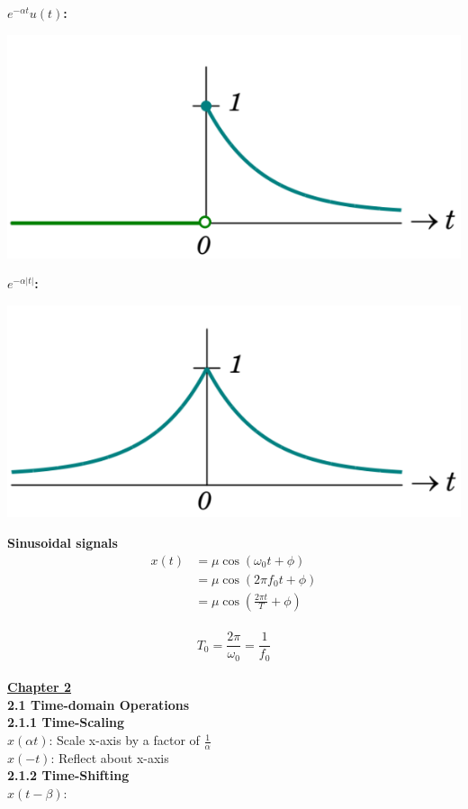 \documentclass[6pt,landscape,a4paper]{extarticle}
\newenvironment{Figure}
  {\par\medskip\noindent\minipage{\linewidth}}
  {\endminipage\par\medskip}
\begin{document}
\begin{multicols*}{5}
\begin{Figure}
    \end{Figure}
    \textbf{$e^{-\alpha t}u(t)$: }
    \begin{Figure}
        \centering
        \includegraphics[width=0.8\linewidth]{images/rightSidedDecayingExp.png}
    \end{Figure}
    \textbf{$e^{-\alpha |t|}$: }
    \begin{Figure}
        \centering
        \includegraphics[width=0.8\linewidth]{images/twoSidedDecayingExp.png}
    \end{Figure}
    \textbf{Sinusoidal signals}
    \begin{align*}
        x(t)&=\mu \cos(\omega_0t+\phi)\\
        &= \mu\cos(2\pi f_0t + \phi)\\
        &= \mu\cos(\frac{2\pi t}{T} + \phi)
    \end{align*}\\
    \[
        T_0=\frac{2\pi}{\omega_0}=\frac{1}{f_0}
    \]\\
    \textbf{\uline{Chapter 2}}\\
    \textbf{2.1 Time-domain Operations}\\
    \textbf{2.1.1 Time-Scaling}\\
    $x(\alpha t)$: Scale x-axis by a factor of $\frac{1}{\alpha}$\\
    $x(-t)$: Reflect about x-axis\\
    \textbf{2.1.2 Time-Shifting}\\
    $x(t-\beta)$:\\

\end{multicols*}
\end{document}
